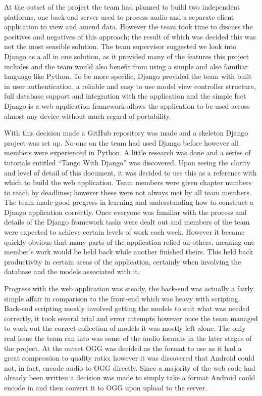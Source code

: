 \documentclass{l3proj}
\begin{document}
At the outset of the project the team had planned to build two independent platforms, one back-end server used to process audio and a separate client application to view and amend data. However the team took time to discuss the positives and negatives of this approach; the result of which was decided this was not the most sensible solution. 
The team supervisor suggested we look into Django as a all in one solution, as it provided many of the features this project includes and the team would also benefit from using a simple and also familiar language like Python. 
To be more specific, Django provided the team with built in user authentication, a reliable and easy to use model view controller structure, full database support and integration with the application and the simple fact Django is a web application framework allows the application to be used across almost any device without much regard of portability.

With this decision made a GitHub repository was made and a skeleton Django project was set up. No-one on the team had used Django before however all members were experienced in Python. A little research was done and a series of tutorials entitled “Tango With Django” was discovered.
Upon seeing the clarity and level of detail of this document, it was decided to use this as a reference with which to build the web application. 
Team members were given chapter numbers to reach by deadlines; however these were not always met by all team members. The team made good progress in learning and understanding how to construct a Django application correctly. 
Once everyone was familiar with the process and details of the Django framework tasks were dealt out and members of the team were expected to achieve certain levels of work each week. However it became quickly obvious that many parts of the application relied on others, meaning one member’s work would be held back while another finished theirs. This held back productivity in certain areas of the application, certainly when involving the database and the models associated with it.

Progress with the web application was steady, the back-end was actually a fairly simple affair in comparison to the front-end which was heavy with scripting. 
Back-end scripting mostly involved getting the models to suit what was needed correctly, it took several trial and error attempts however once the team managed to work out the correct collection of models it was mostly left alone. The only real issue the team ran into was some of the audio formats in the later stages of the project. At the outset OGG was decided as the format to use as it had a great compression to quality ratio; however it was discovered that Android could not, in fact, encode audio to OGG directly. Since a majority of the web code had already been written a decision was made to simply take a format Android could encode in and then convert it to OGG upon upload to the server. 
\end{document}

